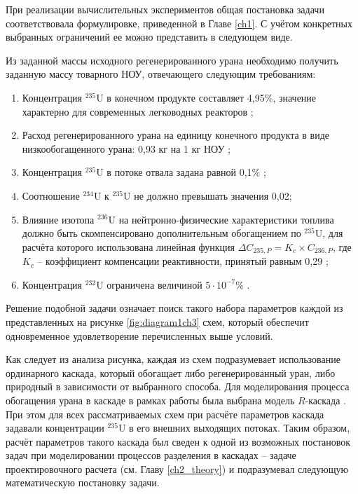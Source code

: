 При реализации вычислительных экспериментов общая постановка задачи соответствовала формулировке, приведенной в Главе \ref{ch1}. С учётом конкретных выбранных ограничений ее можно представить в следующем виде.

Из заданной массы исходного регенерированного урана необходимо получить заданную массу товарного НОУ, отвечающего следующим требованиям:

\begin{enumerate}
  \item Концентрация $^{235}$U в конечном продукте составляет 4,95\%, значение характерно для современных легководных реакторов \cite{solovevaCennostiOYaTKak2019};
  \item Расход регенерированного урана на единицу конечного продукта в виде низкообогащенного урана: 0,93 кг на 1 кг НОУ \cite{smirnovApplyingEnrichmentCapacities2018};
  \item Концентрация $^{235}$U в потоке отвала задана равной 0,1\% \cite{smirnovEvolutionIsotopicComposition2012};
  \item Соотношение $^{234}$U к $^{235}$U не должно превышать значения 0,02;
  \item Влияние изотопа $^{236}$U на нейтронно-физические характеристики топлива должно быть скомпенсировано дополнительным обогащением по $^{235}$U, для расчёта которого использована линейная функция $\Delta C_{235,P}=K_{c}\times C_{236,P}$, где $K_{c}$ -- коэффициент компенсации реактивности, принятый равным 0,29 \cite{smirnovApplyingEnrichmentCapacities2018};
  \item Концентрация $^{232}$U ограничена величиной $5\cdot10^{-7}$\% \cite{smirnovApplyingEnrichmentCapacities2018}.
\end{enumerate}

Решение подобной задачи означает поиск такого набора параметров каждой из представленных на рисунке \ref{fig:diagram1ch3} схем, который обеспечит одновременное удовлетворение перечисленных выше условий. 

Как следует из анализа рисунка, каждая из схем подразумевает использование ординарного каскада, который обогащает либо регенерированный уран, либо природный в зависимости от выбранного способа. Для моделирования процесса обогащения урана в каскаде в рамках работы была выбрана модель $R$-каскада \cite{sulaberidzeTeoriyaKaskadovDlya2011}. При этом для всех рассматриваемых схем при расчёте параметров каскада задавали концентрации $^{235}$U в его внешних выходящих потоках. Таким образом, расчёт параметров такого каскада был сведен к одной из возможных постановок задач при моделировании процессов разделения в каскадах -- задаче проектировочного расчета (см. Главу \ref{ch2_theory}) и подразумевал следующую математическую постановку задачи. 

